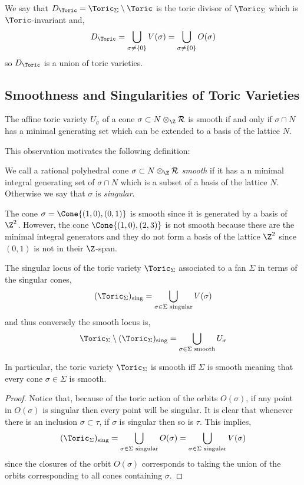 \begin{rmk}
We say that $D_\Toric = \Toric_\Sigma \setminus \Toric$ is the toric divisor of $\Toric_\Sigma$ which is $\Toric$-invariant and,
\[ D_\Toric = \bigcup_{\sigma \neq \{0\}} V(\sigma) = \bigcup_{\sigma \neq \{0\}} O(\sigma) \]
so $D_\Toric$ is a union of toric varieties.
\end{rmk}


\subsection{Smoothness and Singularities of Toric Varieties}

\begin{lemma}
The affine toric variety $U_\sigma$ of a cone $\sigma \subset N \otimes_\Z \R$ is smooth if and only if $\sigma \cap N$ has a minimal generating set which can be extended to a basis of the lattice $N$.
\end{lemma}
\noindent
This observation motivates the following definition:

\begin{defn}
We call a rational polyhedral cone $\sigma \subset N \otimes_\Z \R$ \textit{smooth} if it has a n minimal integral generating set of $\sigma \cap N$ which is a subset of a basis of the lattice $N$. Otherwise we say that $\sigma$ is \textit{singular}.
\end{defn}


\begin{example}
The cone $\sigma = \Cone{(1, 0), (0, 1)}$ is smooth since it is generated by a basis of $\Z^2$. However, the cone $\Cone{(1, 0), (2, 3)}$ is not smooth because these are the minimal integral generators and they do not form a basis of the lattice $\Z^2$ since $(0, 1)$ is not in their $\Z$-span.
\end{example}

\begin{lemma}
The singular locus of the toric variety $\Toric_\Sigma$ associated to a fan $\Sigma$ in terms of the singular cones,
\[ (\Toric_\Sigma)_{\text{sing}} = \bigcup_{\sigma \in \Sigma \text{ singular}} V(\sigma) \]
and thus conversely the smooth locus is,
\[ \Toric_{\Sigma} \setminus (\Toric_\Sigma)_{\text{sing}} = \bigcup_{\sigma \in \Sigma \text{ smooth}} U_\sigma \] 
\end{lemma}
\noindent
In particular, the toric variety $\Toric_\Sigma$ is smooth iff $\Sigma$ is smooth meaning that every cone $\sigma \in \Sigma$ is smooth. 

\begin{proof}
Notice that, because of the toric action of the orbits $O(\sigma)$, if any point in $O(\sigma)$ is singular then every point will be singular. It is clear that whenever there is an inclusion $\sigma \subset \tau$, if $\sigma$ is singular then so is $\tau$. This implies,
\[ (\Toric_\Sigma)_{\text{sing}} = \bigcup_{\sigma \in \Sigma \text{ singular}} O(\sigma) = \bigcup_{\sigma \in \Sigma \text{ singular}} V(\sigma) \]
since the closures of the orbit $O(\sigma)$ corresponds to taking the union of the orbits corresponding to all cones containing $\sigma$. 
\end{proof}


